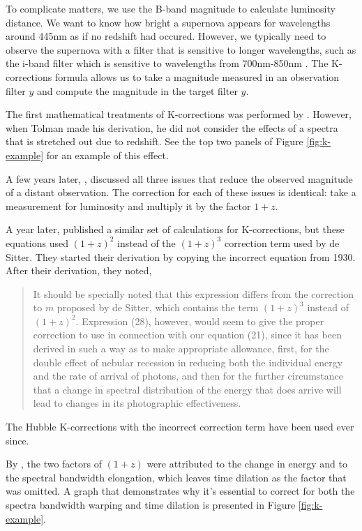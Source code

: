 \documentclass[linenumbers]{aastex631}
\begin{document}
To complicate matters, we use the B-band magnitude to calculate luminosity
distance. We want to know how bright a supernova appears for wavelengths around
445nm as if no redshift had occured. However, we typically need to observe the
supernova with a filter that is sensitive to longer wavelengths, such as the
i-band filter which is sensitive to wavelengths from 700nm-850nm
\citep{flaugher2015}. The K-corrections formula allows us to take a magnitude
measured in an observation filter $y$ and compute the magnitude in the target
filter $y$.

The first mathematical treatments of K-corrections was performed by
\citet{tolman1930}. However, when Tolman made his derivation, he did not
consider the effects of a spectra that is stretched out due to redshift. See
the top two panels of Figure \ref{fig:k-example} for an example of this effect.

A few years later, \citet{desitter1934}, discussed all three issues that reduce
the observed magnitude of a distant observation. The correction for each of
these issues is identical: take a measurement for luminosity and multiply it by
the factor $1 + z$.

A year later, \citet{hubble1935} published a similar set of calculations for
K-corrections, but these equations used $(1 + z)^2$ instead of the $(1 + z)^3$
correction term used by de Sitter. They started their derivation by copying the
incorrect equation from 1930. After their derivation, they noted,

\begin{quote}
It should be specially noted that this expression differs from the correction
to $m$ proposed by de Sitter, which contains the term $(1 + z)^3$ instead of
$(1 + z)^2$. Expression (28), however, would seem to give the proper correction
to use in connection with our equation (21), since it has been derived in such
a way as to make appropriate allowance, first, for the double effect of nebular
recession in reducing both the individual energy and the rate of arrival of
photons, and then for the further circumstance that a change in spectral
distribution of the energy that does arrive will lead to changes in its
photographic effectiveness.
\end{quote}

The Hubble K-corrections with the incorrect correction term have been used ever
since.

By \citet{oke1968}, the two factors of $(1 + z)$ were attributed to the change
in energy and to the spectral bandwidth elongation, which leaves time dilation
as the factor that was omitted. A graph that demonstrates why it's essential to
correct for both the spectra bandwidth warping and time dilation is presented
in Figure \ref{fig:k-example}.
\end{document}
